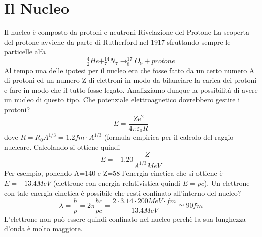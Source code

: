 \section{Il Nucleo}
Il nucleo è composto da protoni e neutroni
Rivelazione del Protone
La scoperta del protone avviene da parte di Rutherford nel 1917 sfruttando sempre le particelle alfa
\[^4_2He +^{14}_{7}N_{7}\to ^{17}_8O_9+protone\]
Al tempo una delle ipotesi per il nucleo era che fosse fatto da un certo numero A di protoni ed un numero Z di elettroni in modo da bilanciare la carica dei protoni e fare in modo che il tutto fosse legato. Analizziamo dunque la possibilità di avere un nucleo di questo tipo.
Che potenziale elettroagnetico dovrebbero gestire i protoni?
\[E=\frac{Ze^2}{4\pi\varepsilon_0R}\]
dove $R=R_0 A^{1/3}=1.2fm\cdot A^{1/3}$ (formula empirica per il calcolo del raggio nucleare. Calcolando si ottiene quindi
\[E=-1.20\frac{Z}{A^{1/3}MeV}\]
Per esempio, ponendo A=140 e Z=58 l'energia cinetica che si ottiene è $E=-13.4MeV$ (elettrone con energia relativistica quindi $E=pc$). Un elettrone con tale energia cinetica è possibile che resti confinato all'interno del nucleo?
\[\lambda=\frac{h}{p}=2\pi \frac{\hbar c}{pc}=\frac{2\cdot 3.14\cdot 200MeV\cdot fm}{13.4MeV}\simeq 90fm\]
L'elettrone non può essere quindi confinato nel nucleo perchè la sua lunghezza d'onda è molto maggiore.